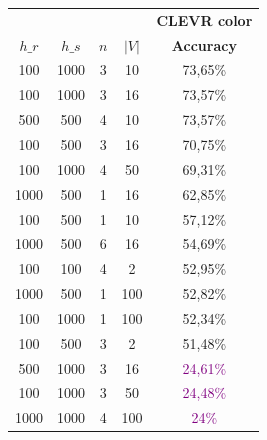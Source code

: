\begin{table}[ht]
    \centering
    \begin{tabular}{cccc|c}
        \toprule
                                      &           &     &       & \multicolumn{1}{c}{\textbf{CLEVR color}} \\  \cmidrule(lr){5-5}
        $h\_r$                        & $h\_s$    & $n$ & $|V|$ & \textbf{Accuracy}                        \\\midrule
        {100}                         & {1000}    & {3} & {10}  & {73,65\%}                                \\
        {100}                         & {1000}    & {3} & {16}  & {73,57\%}                                \\
        {500}                         & {500}     & {4} & {10}  & {73,57\%}                                \\
        {100}                         & {500}     & {3} & {16}  & {70,75\%}                                \\
        {100}                         & {1000}    & {4} & {50}  & {69,31\%}                                \\
        {1000}                        & {500}     & {1} & {16}  & {62,85\%}                                \\
        {100}                         & {500}     & {1} & {10}  & {57,12\%}                                \\
        {1000}                        & {500}     & {6} & {16}  & {54,69\%}                                \\
        {100}                         & {100}     & {4} & {2}   & {52,95\%}                                \\
        {1000}                        & {500}     & {1} & {100} & {52,82\%}                                \\
        {100}                         & {1000}    & {1} & {100} & {52,34\%}                                \\
        {100}                         & {500}     & {3} & {2}   & {51,48\%}                                \\
        {500}                         & {1000}    & {3} & {16}  & \textcolor{purple}{24,61\%}              \\
        {100}                         & {1000}    & {3} & {50}  & \textcolor{purple}{24,48\%}              \\
        {1000}                        & {1000}    & {4} & {100} & \textcolor{purple}{24\%}                 \\

\end{tabular}
\end{table}
